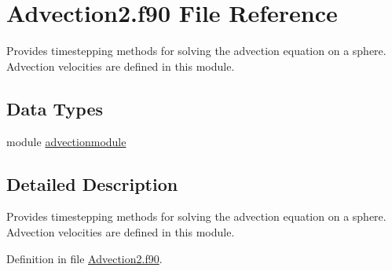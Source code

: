 \hypertarget{Advection2_8f90}{\section{Advection2.\+f90 File Reference}
\label{Advection2_8f90}
}


Provides timestepping methods for solving the advection equation on a sphere. Advection velocities are defined in this module.  


\subsection*{Data Types}
\begin{DoxyCompactItemize}
\item 
module \hyperlink{classadvectionmodule}{advectionmodule}
\end{DoxyCompactItemize}


\subsection{Detailed Description}
Provides timestepping methods for solving the advection equation on a sphere. Advection velocities are defined in this module. 



Definition in file \hyperlink{Advection2_8f90_source}{Advection2.\+f90}.

